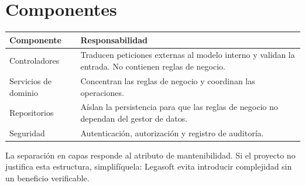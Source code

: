 \documentclass[11pt,a4paper]{article}
\begin{document}
\section*{Componentes}

\begin{center}
\begin{tabularx}{\linewidth}{@{}L{3.6cm} Y@{}}
\toprule
\sffamily\bfseries\color{lgPrimario}Componente &
\sffamily\bfseries\color{lgPrimario}Responsabilidad \\
\midrule
Controladores        & Traducen peticiones externas al modelo interno y validan la entrada. No contienen reglas de negocio. \\
Servicios de dominio & Concentran las reglas de negocio y coordinan las operaciones. \\
Repositorios         & Aíslan la persistencia para que las reglas de negocio no dependan del gestor de datos. \\
Seguridad            & Autenticación, autorización y registro de auditoría. \\
\bottomrule
\end{tabularx}
\end{center}

\begin{nota}
La separación en capas responde al atributo de mantenibilidad. Si el proyecto no
justifica esta estructura, simplifíquela: Legasoft evita introducir complejidad
sin un beneficio verificable.
\end{nota}
\end{document}
